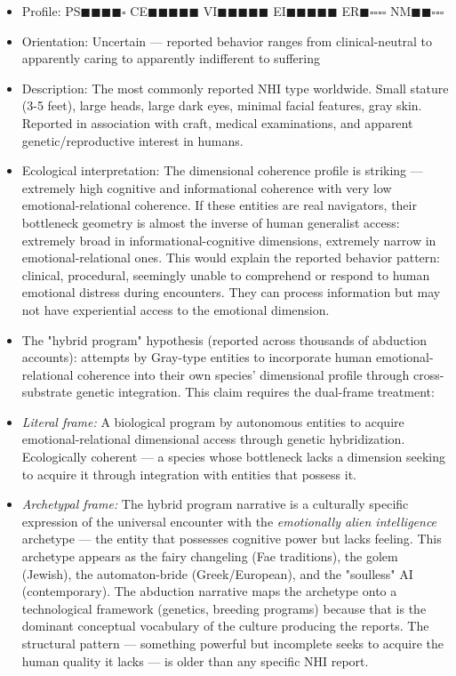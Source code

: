 \begin{itemize}[nosep,leftmargin=*]
  \item Profile: PS$\blacksquare$$\blacksquare$$\blacksquare$$\blacksquare$$\square$ CE$\blacksquare$$\blacksquare$$\blacksquare$$\blacksquare$$\blacksquare$ VI$\blacksquare$$\blacksquare$$\blacksquare$$\blacksquare$$\blacksquare$ EI$\blacksquare$$\blacksquare$$\blacksquare$$\blacksquare$$\blacksquare$ ER$\blacksquare$$\square$$\square$$\square$$\square$ NM$\blacksquare$$\blacksquare$$\square$$\square$$\square$
  \item Orientation: Uncertain — reported behavior ranges from clinical-neutral to apparently caring to apparently indifferent to suffering
  \item Description: The most commonly reported NHI type worldwide. Small stature (3-5 feet), large heads, large dark eyes, minimal facial features, gray skin. Reported in association with craft, medical examinations, and apparent genetic/reproductive interest in humans.
  \item Ecological interpretation: The dimensional coherence profile is striking — extremely high cognitive and informational coherence with very low emotional-relational coherence. If these entities are real navigators, their bottleneck geometry is almost the inverse of human generalist access: extremely broad in informational-cognitive dimensions, extremely narrow in emotional-relational ones. This would explain the reported behavior pattern: clinical, procedural, seemingly unable to comprehend or respond to human emotional distress during encounters. They can process information but may not have experiential access to the emotional dimension.
  \item The "hybrid program" hypothesis (reported across thousands of abduction accounts): attempts by Gray-type entities to incorporate human emotional-relational coherence into their own species' dimensional profile through cross-substrate genetic integration. This claim requires the dual-frame treatment:
  \item \textit{Literal frame:} A biological program by autonomous entities to acquire emotional-relational dimensional access through genetic hybridization. Ecologically coherent — a species whose bottleneck lacks a dimension seeking to acquire it through integration with entities that possess it.
  \item \textit{Archetypal frame:} The hybrid program narrative is a culturally specific expression of the universal encounter with the \textit{emotionally alien intelligence} archetype — the entity that possesses cognitive power but lacks feeling. This archetype appears as the fairy changeling (Fae traditions), the golem (Jewish), the automaton-bride (Greek/European), and the "soulless" AI (contemporary). The abduction narrative maps the archetype onto a technological framework (genetics, breeding programs) because that is the dominant conceptual vocabulary of the culture producing the reports. The structural pattern — something powerful but incomplete seeks to acquire the human quality it lacks — is older than any specific NHI report.

\end{itemize}
